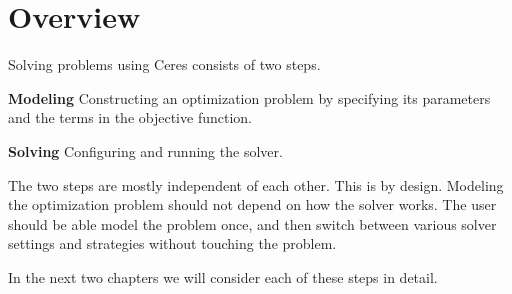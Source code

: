 \chapter{Overview}
\label{chapter:overview}

Solving problems using Ceres consists of two steps.
\begin{description}
\item{\textbf{Modeling}} Constructing an optimization problem by
  specifying its parameters and the terms in the objective function.
\item{\textbf{Solving}} Configuring and running the solver.
\end{description}

The two steps are mostly independent of each other. This is by
design. Modeling the optimization problem should not depend on how the
solver works. The user should be able model the problem once, and then
switch between various solver settings and strategies without touching
the problem.

In the next two chapters we will consider each of these steps in detail.
